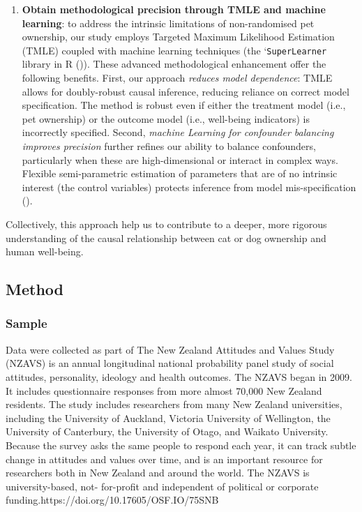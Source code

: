 \documentclass[
  singlecolumn,
  9pt]{article}
\begin{document}
\begin{enumerate}
\item
  \textbf{Obtain methodological precision through TMLE and machine
  learning}: to address the intrinsic limitations of non-randomised pet
  ownership, our study employs Targeted Maximum Likelihood Estimation
  (TMLE) coupled with machine learning techniques (the
  `\texttt{SuperLearner\textasciigrave{}} library in R
  ()). These
  advanced methodological enhancement offer the following benefits.
  First, our approach \emph{reduces model dependence}: TMLE allows for
  doubly-robust causal inference, reducing reliance on correct model
  specification. The method is robust even if either the treatment model
  (i.e., pet ownership) or the outcome model (i.e., well-being
  indicators) is incorrectly specified. Second, \emph{machine Learning
  for confounder balancing improves precision} further refines our
  ability to balance confounders, particularly when these are
  high-dimensional or interact in complex ways. Flexible semi-parametric
  estimation of parameters that are of no intrinsic interest (the
  control variables) protects inference from model mis-specification
  ().
\end{enumerate}

Collectively, this approach help us to contribute to a deeper, more
rigorous understanding of the causal relationship between cat or dog
ownership and human well-being.

\subsection{Method}\label{method}

\subsubsection{Sample}\label{sample}

Data were collected as part of The New Zealand Attitudes and Values
Study (NZAVS) is an annual longitudinal national probability panel study
of social attitudes, personality, ideology and health outcomes. The
NZAVS began in 2009. It includes questionnaire responses from more
almost 70,000 New Zealand residents. The study includes researchers from
many New Zealand universities, including the University of Auckland,
Victoria University of Wellington, the University of Canterbury, the
University of Otago, and Waikato University. Because the survey asks the
same people to respond each year, it can track subtle change in
attitudes and values over time, and is an important resource for
researchers both in New Zealand and around the world. The NZAVS is
university-based, not- for-profit and independent of political or
corporate funding.https://doi.org/10.17605/OSF.IO/75SNB
\end{document}
